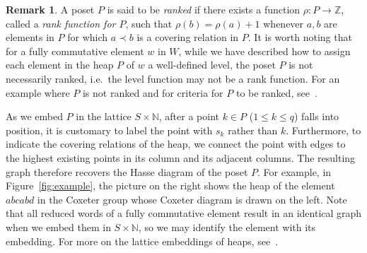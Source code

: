 \documentclass[10pt]{article}
\theoremstyle{definition}
\newtheorem{rema}[theorem]{Remark}
\providecommand{\ie}{i.e.\ }
\newcommand{\N}{\mathbb{N}}
\newcommand{\Z}{\mathbb{Z}}
\newcommand{\ra}{\rightarrow}
\begin{document}
 \begin{rema}
 A poset $P$ is said to be \emph{ranked} if there exists a function
 $\rho: P\ra \Z$, called a \emph{rank function for $P$}, such that
 $\rho(b)=\rho(a)+1$ whenever $a,b$ are elements in $P$ for which $a\prec b$
 is a covering relation in
 $P$. It is worth noting that for a fully commutative element
 $w$ in
 $W$, while we have described how to assign each element in the heap $P$
 of $w$ a
 well-defined level, the poset $P$ is not
 necessarily ranked, \ie the level function may not be a rank function.
 For an example where $P$ is not ranked and for criteria for $P$ to be
 ranked, see~\cite{Green_interval}.
 \end{rema}

 
 As we embed $P$ in the lattice $S\times \N$, after a point $k\in P$ ($1\le k\le q$) falls into position, it is customary to
 label the point with $s_k$ rather than $k$. Furthermore, to indicate the covering relations of the heap, we connect the point with
 edges to the highest existing points in its column and its adjacent
 columns. The resulting graph therefore recovers the Hasse diagram
 of the poset $P$. 
 For example, in Figure~\ref{fig:example}, the picture on the right shows the heap of
 the element $abcabd$ in the Coxeter group whose Coxeter diagram is drawn on the
 left. Note that
 all reduced words of a fully commutative element result in an identical
 graph when we embed them in $S\times \N$, so
 we may identify the element with its embedding. For more on the lattice
 embeddings of heaps, see~\cite{BJ}.

 
\end{document}

